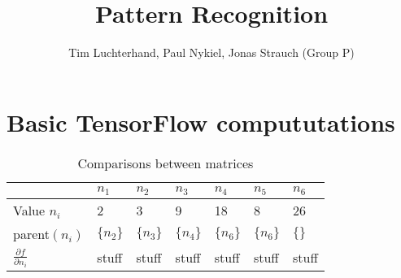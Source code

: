 \documentclass[DIN, pagenumber=false, fontsize=11pt, parskip=half]{scrartcl}
\title{Pattern Recognition}
\author{Tim Luchterhand, Paul Nykiel, Jonas Strauch (Group P)}
\begin{document}
    \maketitle
    \section{Basic TensorFlow compututations}
    \begin{table}[H]
        \centering
        \begin{tabularx}{\textwidth}{lllllll}
            \toprule
            & $n_1$ & $n_2$ & $n_3$ & $n_4$ & $n_5$ & $n_6$ \\
            \midrule
            Value $n_i$ & 2 & 3 & 9 & 18 & 8 & 26\\
            parent$(n_i)$ & $\{n_2\}$ & $\{n_3\}$ & $\{n_4\}$ & $\{n_6\}$ & $\{n_6\}$ & $\{\}$ \\
            $\frac{\partial f}{\partial n_i}$& stuff & stuff & stuff & stuff & stuff & stuff \\
            \bottomrule
        \end{tabularx}
        \caption{Comparisons between matrices}
    \end{table}
\end{document}
